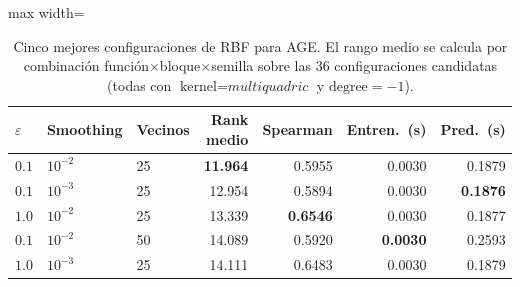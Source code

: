\begin{table}[H]
    \centering
    \small
    \setlength{\tabcolsep}{4pt}
    \begin{adjustbox}{max width=\textwidth}
        \begin{tabular}{lll|rrrr}
            \toprule
            \textbf{$\varepsilon$} & \textbf{Smoothing} & \textbf{Vecinos} & \textbf{Rank medio} & \textbf{Spearman} & \textbf{Entren.\ (s)} & \textbf{Pred.\ (s)} \\
            \midrule
            $0.1$ & $10^{-2}$ & 25 & \textbf{11.964} & 0.5955 & 0.0030 & 0.1879 \\
            $0.1$ & $10^{-3}$ & 25 & 12.954 & 0.5894 & 0.0030 & \textbf{0.1876} \\
            $1.0$ & $10^{-2}$ & 25 & 13.339 & \textbf{0.6546} & 0.0030 & 0.1877 \\
            $0.1$ & $10^{-2}$ & 50 & 14.089 & 0.5920 & \textbf{0.0030} & 0.2593 \\
            $1.0$ & $10^{-3}$ & 25 & 14.111 & 0.6483 & 0.0030 & 0.1879 \\
            \bottomrule
        \end{tabular}
    \end{adjustbox}
    \caption[Cinco mejores configuraciones de RBF para AGE según rango medio sobre Spearman interno.]{Cinco mejores configuraciones de RBF para AGE. El rango medio se calcula por combinación función$\times$bloque$\times$semilla sobre las 36 configuraciones candidatas (todas con $\text{kernel}=\textit{multiquadric}$ y $\text{degree}=-1$).}
    \label{tab:ajuste_interno_rbf_age}
\end{table}
